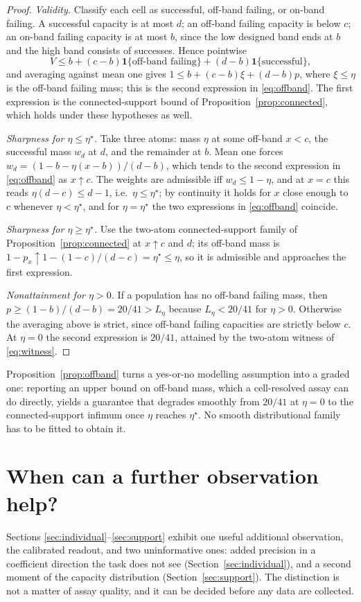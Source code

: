 \documentclass[11pt]{article}
\theoremstyle{definition}
\newcommand{\ind}{\mathbf 1}
\begin{document}
\begin{proof}
\emph{Validity.} Classify each cell as successful, off-band failing, or on-band
failing. A successful capacity is at most $d$; an off-band failing capacity is
below $c$; an on-band failing capacity is at most $b$, since the low designed
band ends at $b$ and the high band consists of successes. Hence pointwise
\[
  V\le b+(c-b)\ind\{\text{off-band failing}\}+(d-b)\ind\{\text{successful}\},
\]
and averaging against mean one gives $1\le b+(c-b)\xi+(d-b)p$, where
$\xi\le\eta$ is the off-band failing mass; this is the second expression in
\eqref{eq:offband}. The first expression is the connected-support bound of
Proposition~\ref{prop:connected}, which holds under these hypotheses as well.

\emph{Sharpness for $\eta\le\eta^\star$.} Take three atoms: mass $\eta$ at
some off-band $x<c$, the successful mass $w_d$ at $d$, and the remainder at
$b$. Mean one forces $w_d=(1-b-\eta(x-b))/(d-b)$, which tends to the second
expression in \eqref{eq:offband} as $x\uparrow c$. The weights are admissible
iff $w_d\le1-\eta$, and at $x=c$ this reads $\eta(d-c)\le d-1$, i.e.\
$\eta\le\eta^\star$; by continuity it holds for $x$ close enough to $c$
whenever $\eta<\eta^\star$, and for $\eta=\eta^\star$ the two expressions in
\eqref{eq:offband} coincide.

\emph{Sharpness for $\eta\ge\eta^\star$.} Use the two-atom connected-support
family of Proposition~\ref{prop:connected} at $x\uparrow c$ and $d$; its
off-band mass is $1-p_x\uparrow1-(1-c)/(d-c)=\eta^\star\le\eta$, so it is
admissible and approaches the first expression.

\emph{Nonattainment for $\eta>0$.} If a population has no off-band failing
mass, then $p\ge(1-b)/(d-b)=20/41>L_\eta$ because $L_\eta<20/41$ for
$\eta>0$. Otherwise the averaging above is strict, since off-band failing
capacities are strictly below $c$. At $\eta=0$ the second expression is
$20/41$, attained by the two-atom witness of \eqref{eq:witness}.
\end{proof}

Proposition~\ref{prop:offband} turns a yes-or-no modelling assumption into a
graded one: reporting an upper bound on off-band mass, which a cell-resolved
assay can do directly, yields a guarantee that degrades smoothly from $20/41$
at $\eta=0$ to the connected-support infimum once $\eta$ reaches
$\eta^\star$. No smooth distributional family has to be fitted to obtain it.

\section{When can a further observation help?}\label{sec:diagnostic}
Sections \ref{sec:individual}--\ref{sec:support} exhibit one useful additional
observation, the calibrated readout, and two uninformative ones: added
precision in a coefficient direction the task does not see
(Section~\ref{sec:individual}), and a second moment of the capacity
distribution (Section~\ref{sec:support}). The distinction is not a matter of
assay quality, and it can be decided before any data are collected.
\end{document}

